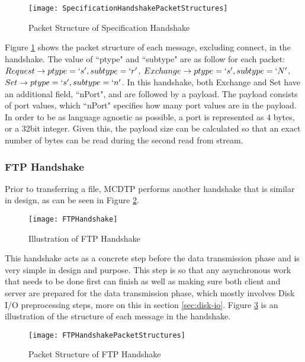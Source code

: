 \begin{figure}[ht]
\centering
\texttt{[image: SpecificationHandshakePacketStructures]}
\caption{Packet Structure of Specification Handshake}
\label{fig:specs-struct}
\end{figure}

Figure \ref{fig:specs-struct} shows the packet structure of each message, excluding connect, in the handshake. The value of ``ptype" and ``subtype" are as follow for each packet: $Request \rightarrow ptype = \lq{s}\rq,subtype = \lq{r}\rq$, $Exchange \rightarrow ptype = \lq{s}\rq,subtype = \lq{N}\rq$, $Set \rightarrow ptype = \lq{s}\rq,subtype = \lq{n}\rq$. In this handshake, both Exchange and Set have an additional field, ``nPort", and are followed by a payload. The payload consists of port values, which ``nPort" specifies how many port values are in the payload. In order to be as language agnostic as possible, a port is represented as 4 bytes, or a 32bit integer. Given this, the payload size can be calculated so that an exact number of bytes can be read during the second read from stream.

\subsubsection{FTP Handshake}

Prior to transferring a file, MCDTP performs another handshake that is similar in design, as can be seen in Figure \ref{fig:ftp-hs}.

\begin{figure}[ht]
\centering
\texttt{[image: FTPHandshake]}
\caption{Illustration of FTP Handshake}
\label{fig:ftp-hs}
\end{figure}

This handshake acts as a concrete step before the data transmission phase and is very simple in design and purpose. This step is so that any asynchronous work that needs to be done first can finish as well as making sure both client and server are prepared for the data transmission phase, which mostly involves Disk I/O preprocessing steps, more on this in section \ref{sec:disk-io}. Figure \ref{fig:ftp-struct} is an illustration of the structure of each message in the handshake.

\begin{figure}[ht]
\centering
\texttt{[image: FTPHandshakePacketStructures]}
\caption{Packet Structure of FTP Handshake}
\label{fig:ftp-struct}
\end{figure}


